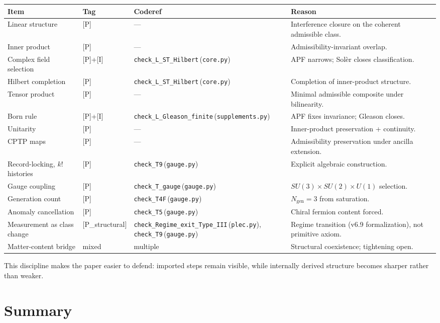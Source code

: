 \documentclass[11pt]{article}
\newcommand{\coderef}[2]{\texttt{#1}\,(\texttt{#2})}
\begin{document}
\begin{center}
\begin{tabular}{@{}llll@{}}
\toprule
Item & Tag & Coderef & Reason \\
\midrule
Linear structure & [P] & --- & Interference closure on the coherent admissible class. \\
Inner product & [P] & --- & Admissibility-invariant overlap. \\
Complex field selection & [P]+[I] & \coderef{check\_L\_ST\_Hilbert}{core.py} & APF narrows; Sol\`er closes classification. \\
Hilbert completion & [P] & \coderef{check\_L\_ST\_Hilbert}{core.py} & Completion of inner-product structure. \\
Tensor product & [P] & --- & Minimal admissible composite under bilinearity. \\
Born rule & [P]+[I] & \coderef{check\_L\_Gleason\_finite}{supplements.py} & APF fixes invariance; Gleason closes. \\
Unitarity & [P] & --- & Inner-product preservation + continuity. \\
CPTP maps & [P] & --- & Admissibility preservation under ancilla extension. \\
Record-locking, $k!$ histories & [P] & \coderef{check\_T9}{gauge.py} & Explicit algebraic construction. \\
Gauge coupling & [P] & \coderef{check\_T\_gauge}{gauge.py} & $SU(3)\!\times\!SU(2)\!\times\!U(1)$ selection. \\
Generation count & [P] & \coderef{check\_T4F}{gauge.py} & $N_{\mathrm{gen}} = 3$ from saturation. \\
Anomaly cancellation & [P] & \coderef{check\_T5}{gauge.py} & Chiral fermion content forced. \\
Measurement as class change & [P\_structural] & \coderef{check\_Regime\_exit\_Type\_III}{plec.py}, \coderef{check\_T9}{gauge.py} & Regime transition (v6.9 formalization), not primitive axiom. \\
Matter-content bridge & mixed & multiple & Structural coexistence; tightening open. \\
\bottomrule
\end{tabular}
\end{center}

This discipline makes the paper easier to defend: imported steps remain visible,
while internally derived structure becomes sharper rather than weaker.

\section{Summary}\label{sec:summary}
\end{document}

